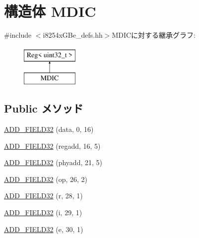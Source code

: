 \hypertarget{structiGbReg_1_1Regs_1_1MDIC}{
\section{構造体 MDIC}
\label{structiGbReg_1_1Regs_1_1MDIC}
}


{\ttfamily \#include $<$i8254xGBe\_\-defs.hh$>$}MDICに対する継承グラフ:\begin{figure}[H]
\begin{center}
\leavevmode
\includegraphics[height=2cm]{structiGbReg_1_1Regs_1_1MDIC}
\end{center}
\end{figure}
\subsection*{Public メソッド}
\begin{DoxyCompactItemize}
\item 
\hyperlink{structiGbReg_1_1Regs_1_1MDIC_ae1e7551607b5abdf2586f2cf8d72650d}{ADD\_\-FIELD32} (data, 0, 16)
\item 
\hyperlink{structiGbReg_1_1Regs_1_1MDIC_a9e85282accff6e24b2d6fd6aa264dfba}{ADD\_\-FIELD32} (regadd, 16, 5)
\item 
\hyperlink{structiGbReg_1_1Regs_1_1MDIC_aacfd0814f3ef498c2700b64eeb082644}{ADD\_\-FIELD32} (phyadd, 21, 5)
\item 
\hyperlink{structiGbReg_1_1Regs_1_1MDIC_ae4c62feeb3622a99f6b1511840e5e451}{ADD\_\-FIELD32} (op, 26, 2)
\item 
\hyperlink{structiGbReg_1_1Regs_1_1MDIC_a96a1ea27892b025fdb0ff06b4fdb282e}{ADD\_\-FIELD32} (r, 28, 1)
\item 
\hyperlink{structiGbReg_1_1Regs_1_1MDIC_a42f6f01d0ebc4a3166919b3a98b2f600}{ADD\_\-FIELD32} (i, 29, 1)
\item 
\hyperlink{structiGbReg_1_1Regs_1_1MDIC_a062fab35d03e0e157938beffaaecd5ab}{ADD\_\-FIELD32} (e, 30, 1)
\end{DoxyCompactItemize}


